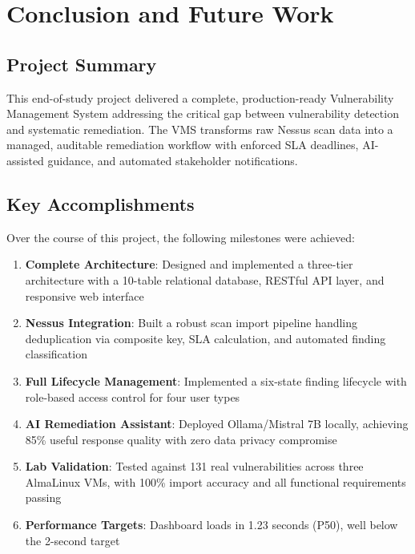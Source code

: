 \chapter*{Conclusion and Future Work}
\label{chap:conclusion}

\section*{Project Summary}

This end-of-study project delivered a complete, production-ready Vulnerability Management System addressing the critical gap between vulnerability detection and systematic remediation. The VMS transforms raw Nessus scan data into a managed, auditable remediation workflow with enforced SLA deadlines, AI-assisted guidance, and automated stakeholder notifications.

\section*{Key Accomplishments}

Over the course of this project, the following milestones were achieved:

\begin{enumerate}
  \item \textbf{Complete Architecture}: Designed and implemented a three-tier architecture with a 10-table relational database, RESTful API layer, and responsive web interface
  \item \textbf{Nessus Integration}: Built a robust scan import pipeline handling deduplication via composite key, SLA calculation, and automated finding classification
  \item \textbf{Full Lifecycle Management}: Implemented a six-state finding lifecycle with role-based access control for four user types
  \item \textbf{AI Remediation Assistant}: Deployed Ollama/Mistral 7B locally, achieving 85\% useful response quality with zero data privacy compromise
  \item \textbf{Lab Validation}: Tested against 131 real vulnerabilities across three AlmaLinux VMs, with 100\% import accuracy and all functional requirements passing
  \item \textbf{Performance Targets}: Dashboard loads in 1.23 seconds (P50), well below the 2-second target
\end{enumerate}

